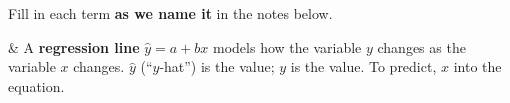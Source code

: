 \documentclass[12pt]{article}
\begin{document}

\vspace{2pt}

\boxguard[16]
\begin{vocabbox}
\small
Fill in each term \textbf{as we name it} in the notes below.
\par
{}
\par
{}
\par
{}
\par
{}
\par
\end{vocabbox}

\small
\begin{guidednotes}
 &
A \textbf{regression line} $\hat{y}=a+bx$ models how the \blank{1.7cm} variable $y$ changes
as the \blank{2.1cm} variable $x$ changes. $\hat{y}$ (``$y$-hat'') is the \blank{1.8cm}
value; $y$ is the \blank{1.3cm} value. To predict, \blank{1.9cm} $x$ into the equation.


\end{guidednotes}
\end{document}
